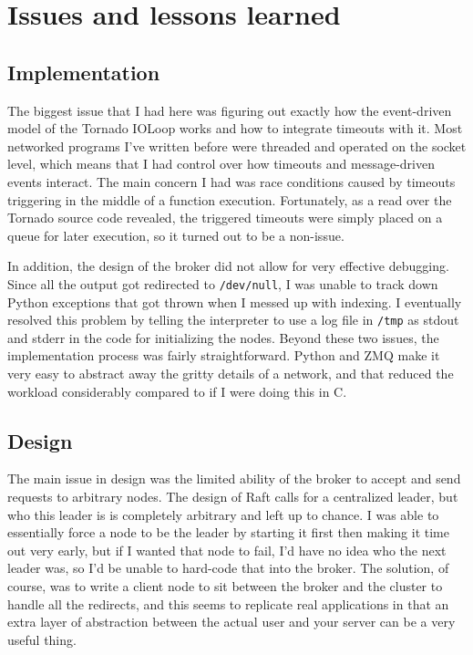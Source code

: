 \documentclass[psamsfonts]{amsart}
\begin{document}
\section{Issues and lessons learned}
\subsection{Implementation}
The biggest issue that I had here was figuring out exactly how the event-driven model of the Tornado IOLoop works and how to integrate timeouts with it. Most networked programs I've written before were threaded and operated on the socket level, which means that I had control over how timeouts and message-driven events interact. The main concern I had was race conditions caused by timeouts triggering in the middle of a function execution. Fortunately, as a read over the Tornado source code revealed, the triggered timeouts were simply placed on a queue for later execution, so it turned out to be a non-issue.

In addition, the design of the broker did not allow for very effective debugging. Since all the output got redirected to \verb|/dev/null|, I was unable to track down Python exceptions that got thrown when I messed up with indexing. I eventually resolved this problem by telling the interpreter to use a log file in \verb|/tmp| as stdout and stderr in the code for initializing the nodes. Beyond these two issues, the implementation process was fairly straightforward. Python and ZMQ make it very easy to abstract away the gritty details of a network, and that reduced the workload considerably compared to if I were doing this in C.
\subsection{Design}
The main issue in design was the limited ability of the broker to accept and send requests to arbitrary nodes. The design of Raft calls for a centralized leader, but who this leader is is completely arbitrary and left up to chance. I was able to essentially force a node to be the leader by starting it first then making it time out very early, but if I wanted that node to fail, I'd have no idea who the next leader was, so I'd be unable to hard-code that into the broker. The solution, of course, was to write a client node to sit between the broker and the cluster to handle all the redirects, and this seems to replicate real applications in that an extra layer of abstraction between the actual user and your server can be a very useful thing.
\end{document}
